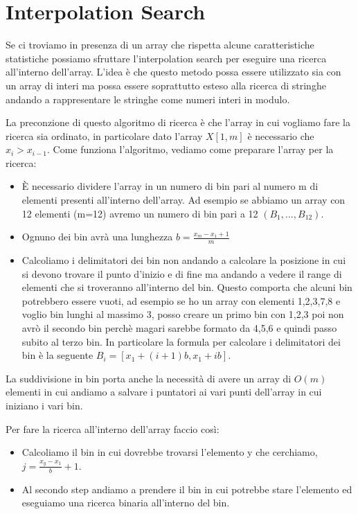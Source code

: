 \documentclass[14pt]{extreport}
\begin{document}
\section{Interpolation Search}

Se ci troviamo in presenza di un array che rispetta alcune caratteristiche statistiche possiamo sfruttare l'interpolation search per eseguire una ricerca all'interno dell'array.
L'idea è che questo metodo possa essere utilizzato sia con un array di interi ma possa essere soprattutto esteso alla ricerca di stringhe andando a rappresentare le stringhe come numeri interi in modulo.

La preconzione di questo algoritmo di ricerca è che l'array in cui vogliamo fare la ricerca sia ordinato, in particolare dato l'array $X[1,m]$ è necessario che $x_i > x_{i-1}$.
Come funziona l'algoritmo, vediamo come preparare l'array per la ricerca:
\begin{itemize}
\item È necessario dividere l'array in un numero di bin pari al numero m di elementi presenti all'interno dell'array. Ad esempio se abbiamo un array con 12 elementi (m=12) avremo un numero di bin pari a 12 $(B_1,...,B_12)$.
\item Ognuno dei bin avrà una lunghezza $b=\frac{x_m-x_1+1}{m}$
\item Calcoliamo i delimitatori dei bin non andando a calcolare la posizione in cui si devono trovare il punto d'inizio e di fine ma andando a vedere il range di elementi che si troveranno all'interno del bin. Questo comporta che alcuni bin potrebbero essere vuoti, ad esempio se ho un array con elementi 1,2,3,7,8 e voglio bin lunghi al massimo 3, posso creare un primo bin con 1,2,3 poi non avrò il secondo bin perchè magari sarebbe formato da 4,5,6 e quindi passo subito al terzo bin. In particolare la formula per calcolare i delimitatori dei bin è la seguente $B_i=[x_1+(i+1)b, x_1+ib]$.
\end{itemize}

La suddivisione in bin porta anche la necessità di avere un array di $O(m)$ elementi in cui andiamo a salvare i puntatori ai vari punti dell'array in cui iniziano i vari bin.

Per fare la ricerca all'interno dell'array faccio così:
\begin{itemize}
\item Calcoliamo il bin in cui dovrebbe trovarsi l'elemento y che cerchiamo, $j = \frac{x_y-x_1}{b} + 1$. 
\item Al secondo step andiamo a prendere il bin in cui potrebbe stare l'elemento ed eseguiamo una ricerca binaria all'interno del bin.
\end{itemize}
\end{document}
